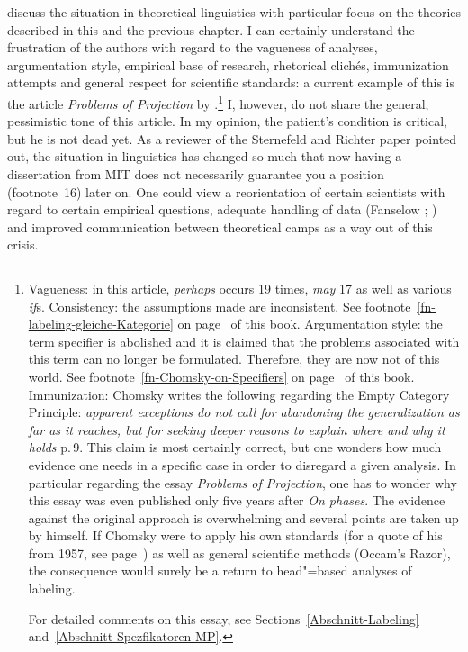 \citet{SR2012a} discuss the situation in theoretical linguistics with particular focus on the
theories described in this and the previous chapter. I can certainly understand the frustration of
the authors with regard to the vagueness of analyses, argumentation style, empirical base of
research, rhetorical clich\'{e}s, immunization attempts and general respect for scientific
standards: a current example of this is the article \emph{Problems of Projection} by \citet{Chomsky2013a}.\footnote{%
  Vagueness: in this article, \emph{perhaps} occurs 19 times, \emph{may} 17 as well as various \emph{if}s. Consistency: the assumptions made
  are inconsistent. See footnote~\ref{fn-labeling-gleiche-Kategorie} on
  page~\pageref{fn-labeling-gleiche-Kategorie} of this book. Argumentation style: the
  term specifier is abolished and it is claimed that the problems associated with this term can no longer be formulated. Therefore, they are now
  not of this world. See footnote~\ref{fn-Chomsky-on-Specifiers} on
  page~\pageref{fn-Chomsky-on-Specifiers} of this book. Immunization: Chomsky writes the following regarding the Empty Category Principle:
  \emph{apparent exceptions do not call for abandoning the generalization as far as it reaches, but for seeking
  deeper reasons to explain where and why it holds} p.\,9. This claim is most certainly correct, but one wonders how much evidence one needs
  in a specific case in order to disregard a given analysis. In particular regarding the essay \emph{Problems of Projection}, one has to wonder
  why this essay was even published only five years after \emph{On phases}. The evidence against the original approach is overwhelming and several
  points are taken up by \citet{Chomsky2013a} himself. If Chomsky were to apply his own standards (for a quote of his from 1957, see
  page~\pageref{quote-Chomsky-Formalisierung}) as well as general scientific methods (Occam's Razor), the consequence would surely be a return
  to head"=based analyses of labeling.

  For detailed comments on this essay, see Sections~\ref{Abschnitt-Labeling} and~\ref{Abschnitt-Spezfikatoren-MP}.
}
I, however, do not share the general, pessimistic tone of this article. In my opinion, the patient's condition is critical, but he is not dead yet.
As a reviewer of the Sternefeld and Richter paper pointed out, the situation in linguistics has changed so much that now having a dissertation from 
MIT does not necessarily guarantee you a position (footnote~16) later on. One could view a reorientation of certain scientists with regard to certain empirical
questions, adequate handling of data (Fanselow \citeyear{Fanselow2004b}; \citeyear[]{Fanselow2009a}) and improved communication between
theoretical camps as a way out of this crisis.

